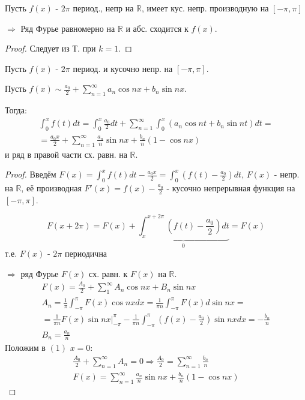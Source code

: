 \documentclass{article}
\theoremstyle{definition}
\numberwithin{theorem}{section}
\numberwithin{lemma}{section}
\numberwithin{definition}{section}
\numberwithin{corollary}{section}
\numberwithin{equation}{section}
\let\implies\Rightarrow
\newcommand\R{\ensuremath{\mathbb{R}}}
\begin{document}
\begin{corollary}
  Пусть $f(x)$ - $2\pi$ период., непр на $\R$, имеет кус. непр.
  производную на $[-\pi,\pi]$

  $\implies$ Ряд Фурье равномерно на $\R$ и абс. сходится к $f(x)$.
\end{corollary}
\begin{proof}
  Следует из Т. при $k=1$.
\end{proof}

\begin{theorem}
  Пусть $f(x)$ - $2\pi$ период. и кусочно непр. на $[-\pi, \pi]$.

  Пусть $f(x) \sim \frac{a_0}{2}+\sum_{n=1}^{\infty}a_n\cos nx + b_n \sin nx$.

  Тогда:
  \begin{gather*}
    \int_{0}^{x}f(t)dt=\int_{0}^{x}\frac{a_0}{2}dt+\sum_{n=1}^{\infty}\int_{0}^{x}(a_n\cos nt + b_n\sin nt)dt = \\
    = \frac{a_0x}{2}+\sum_{n=1}^{\infty}\frac{a_n}{n}\sin nx + \frac{b_n}{n}(1-\cos nx)
  \end{gather*}
  и ряд в правой части сх. равн. на $\R$.

\end{theorem}


\begin{proof}
  Введём $F(x)=\int_{0}^{x}f(t)dt-\frac{a_0x}{2}=\int_{0}^{x}(f(t)-\frac{a_0}{2})dt$,
  $F(x)$ - непр. на $\R$, её производная $F'(x)=f(x) - \frac{a_0}{2}$
  - кусочно непрерывная функция на $[-\pi,\pi]$.

  \[
    F(x+2\pi)=F(x)+\underbrace{\int_{x}^{x+2\pi}(f(t)-\frac{a_0}{2})dt}_{0}=F(x)
  \]
  т.е. $F(x)$ - $2\pi$ периодична

  $\implies$ ряд Фурье $F(x)$ сх. равн. к $F(x)$ на $\R$.
  \begin{gather*}
    F(x)=\frac{A_0}{2}+\sum_{1}^{\infty}A_n\cos nx + B_n\sin nx \tag{$1$} \\ 
    A_n=\frac{1}{\pi}\int_{-\pi}^{\pi}F(x)\cos nx dx=\frac{1}{\pi n}\int_{-\pi}^{\pi}F(x)d\sin nx =\\
    =\frac{1}{\pi n}F(x)\sin nx \Big|_{-\pi}^{\pi} - \frac{1}{\pi n}\int_{-\pi}^{\pi}(f(x)-\frac{a_0}{2})\sin nx dx 
    = -\frac{b_n}{n} \\ 
    B_n=\frac{a_n}{n}
  \end{gather*}
  Положим в $(1)$ $x=0$:
  \begin{gather*}
    \frac{A_0}{2}+\sum_{n=1}^{\infty}A_n=0 \implies \frac{A_0}{2}=\sum_{n=1}^{\infty}\frac{b_n}{n} \\ 
    F(x)=\sum_{n=1}^{\infty}\frac{a_n}{n}\sin nx + \frac{b_n}{n}(1-\cos nx)
  \end{gather*}
\end{proof}
\end{document}
